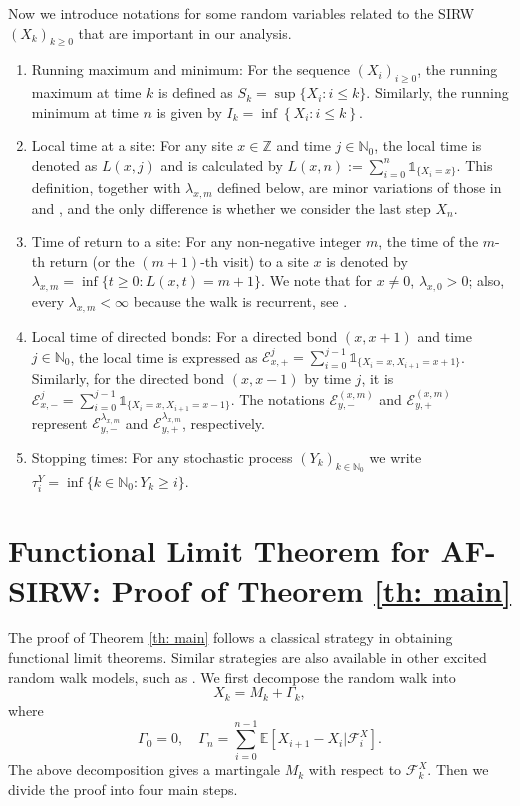 \documentclass[EJP]{ejpecp} %
\begin{document}
Now we introduce notations for some random variables related to the SIRW $(X_k)_{k\geq0}$ that are important in our analysis.
\begin{enumerate}
	\item Running maximum and minimum: For the sequence $(X_i)_{i \ge 0}$, the running maximum at time $k$ is defined as $S_k = \sup\{X_i : i \le k\}$. Similarly, the running minimum at time $n$ is given by $I_k = \inf \left\{X_i: i \le k\right\}$.
	\item
	Local time at a site: For any site $x \in \mathbb{Z}$ and time $j \in \mathbb{N}_0$, the local time is denoted as $L(x,j)$ and is calculated by $L(x,n):= \sum_{i=0}^n \mathbb{1}_{\{X_i=x\}}$. 
	This definition, together with $\lambda_{x, m}$ defined below, are minor variations of those in \cite{KMP23} and \cite{KP16}, and the only difference is whether we consider the last step $X_n$.
	\item
	Time of return to a site: For any non-negative integer $m$, the time of the $m$-th return (or the $(m+1)$-th visit) to a site $x$ is denoted by $\lambda_{x,m} = \inf\{t \geq 0: L(x,t) = m+1\}$. 
	We note that for $x\neq 0$, $\lambda_{x,0} > 0$; also, every $\lambda_{x,m}<\infty$ because the walk is recurrent, see \cite{T96}.
	\item
	Local time of directed bonds: For a directed bond $(x,x+1)$ and time $j \in \mathbb{N}_0$, the local time is expressed as $\mathcal{E}^j_{x,+} = \sum_{i=0}^{j-1} \mathbb{1}_{\{X_i=x, X_{i+1} =x+1\}}$. Similarly, for the directed bond $(x,x-1)$ by time $j$, it is $\mathcal{E}^j_{x,-} = \sum_{i=0}^{j-1} \mathbb{1}_{\{X_i=x, X_{i+1} =x-1\}}$.
	The notations $\mathcal{E}^{(x,m)}_{y, -}$ and $\mathcal{E}^{(x,m)}_{y, +}$ represent $\mathcal{E}^{\lambda_{x,m}}_{y,-}$ and $\mathcal{E}^{\lambda_{x,m}}_{y,+}$, respectively.
	\item
	Stopping times: For any stochastic process $(Y_k)_{k \in \mathbb{N}_0}$ we write $\tau^Y_{i} = \inf \{k \in  \mathbb{N}_0: Y_k \ge  i\}$.
\end{enumerate}
\section{Functional Limit Theorem for AF-SIRW: Proof of Theorem \ref{th: main}}
\label{sec: proof of main}

The proof of Theorem \ref{th: main} follows a classical strategy in obtaining functional limit theorems. 
Similar strategies are also available in other excited random walk models, such as \cite{KP16,KMP23}.
We first decompose the random walk into
\begin{equation}
	\label{eq:decomposition}
	X_k = M_k+ \Gamma_k 
	,\end{equation} 
where
\[ 
\Gamma_0 = 0, \quad \Gamma_n = \sum_{i=0}^{n-1} \mathbb{E}\left[ X_{i+1}-X_i | \mathcal{F}_i^X 
\right].
\]
The above decomposition gives a martingale $M_k$ with respect to $\mathcal{F}_k^X.$ 
Then we divide the proof into four main steps. 
\end{document}
